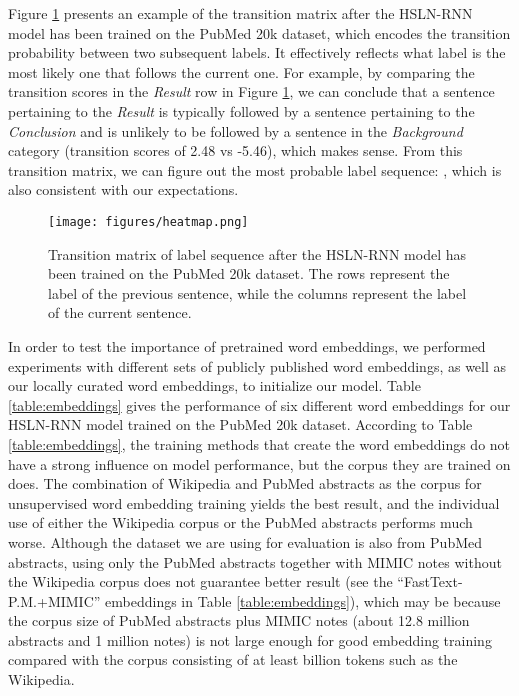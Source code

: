 \documentclass[11pt,a4paper]{article}
\begin{document}
Figure \ref{figure:heatmap} presents an example of the transition matrix after the HSLN-RNN model has been trained on the PubMed 20k dataset, which encodes the transition probability between two subsequent labels. It effectively reflects what label is the most likely one that follows the current one. For example, by comparing the transition scores in the \textit{Result} row in Figure \ref{figure:heatmap}, we can conclude that a sentence pertaining to the \textit{Result} is typically followed by a sentence pertaining to the \textit{Conclusion} and is unlikely to be followed by a sentence in the \textit{Background} category (transition scores of 2.48 vs -5.46), which makes sense. From this transition matrix, we can figure out the most probable label sequence: , which is also consistent with our expectations.


\begin{figure}[h!]
\begin{center}
\texttt{[image: figures/heatmap.png]}
\caption{Transition matrix of label sequence after the HSLN-RNN model has been trained on the PubMed 20k dataset. The rows represent the label of the previous sentence, while the columns represent the label of the current sentence.}
\label{figure:heatmap}
\end{center}
\end{figure}

In order to test the importance of pretrained word embeddings, we performed experiments with different sets of publicly published word embeddings, as well as our locally curated word embeddings, to initialize our model. Table \ref{table:embeddings} gives the performance of six different word embeddings for our HSLN-RNN model trained on the PubMed 20k dataset. According to Table \ref{table:embeddings}, the training methods that create the word embeddings do not have a strong influence on model performance, but the corpus they are trained on does. The combination of Wikipedia and PubMed abstracts as the corpus for unsupervised word embedding training yields the best result, and the individual use of either the Wikipedia corpus or the PubMed abstracts performs much worse. Although the dataset we are using for evaluation is also from PubMed abstracts, using only the PubMed abstracts together with MIMIC notes without the Wikipedia corpus does not guarantee better result (see the ``FastText-P.M.+MIMIC'' embeddings in Table \ref{table:embeddings}), which may be because the corpus size of PubMed abstracts plus MIMIC notes (about 12.8 million abstracts and 1 million notes) is not large enough for good embedding training compared with the corpus consisting of at least billion tokens such as the Wikipedia. 
\end{document}
